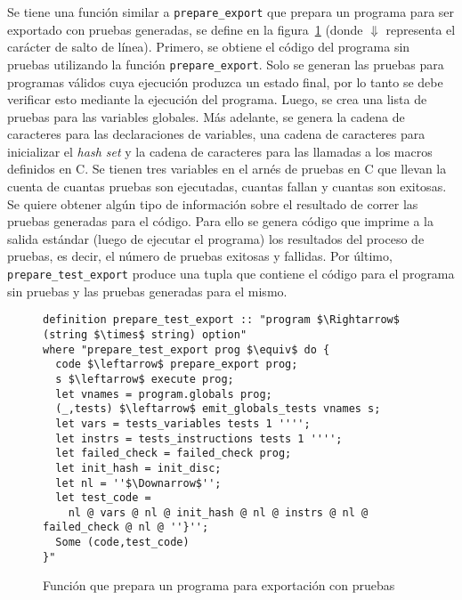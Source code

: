 Se tiene una función similar a \verb|prepare_export| que prepara un programa para ser exportado con pruebas generadas, se define en la figura~\ref{fig:prepare_test_export} (donde $\Downarrow$ representa el carácter de salto de línea).
Primero, se obtiene el código del programa sin pruebas utilizando la función \verb|prepare_export|.
Solo se generan las pruebas para programas válidos cuya ejecución produzca un estado final, por lo tanto se debe verificar esto mediante la ejecución del programa.
Luego, se crea una lista de pruebas para las variables globales.
Más adelante, se genera la cadena de caracteres para las declaraciones de variables, una cadena de caracteres para inicializar el \textit{hash set} y la cadena de caracteres para las llamadas a los macros definidos en C.
Se tienen tres variables en el arnés de pruebas en C que llevan la cuenta de cuantas pruebas son ejecutadas, cuantas fallan y cuantas son exitosas.
Se quiere obtener algún tipo de información sobre el resultado de correr las pruebas generadas para el código.
Para ello se genera código que imprime a la salida estándar (luego de ejecutar el programa) los resultados del proceso de pruebas, es decir, el número de pruebas exitosas y fallidas.
Por último, \verb|prepare_test_export| produce una tupla que contiene el código para el programa sin pruebas y las pruebas generadas para el mismo.

\begin{figure}
\begin{lstlisting}[mathescape=true]
definition prepare_test_export :: "program $\Rightarrow$ (string $\times$ string) option"
where "prepare_test_export prog $\equiv$ do {
  code $\leftarrow$ prepare_export prog;
  s $\leftarrow$ execute prog;
  let vnames = program.globals prog;
  (_,tests) $\leftarrow$ emit_globals_tests vnames s;
  let vars = tests_variables tests 1 '''';
  let instrs = tests_instructions tests 1 '''';
  let failed_check = failed_check prog;
  let init_hash = init_disc;
  let nl = ''$\Downarrow$'';
  let test_code =
    nl @ vars @ nl @ init_hash @ nl @ instrs @ nl @ failed_check @ nl @ ''}'';
  Some (code,test_code)
}"
\end{lstlisting}

\caption{Función que prepara un programa para exportación con pruebas}
\label{fig:prepare_test_export}
\end{figure}


